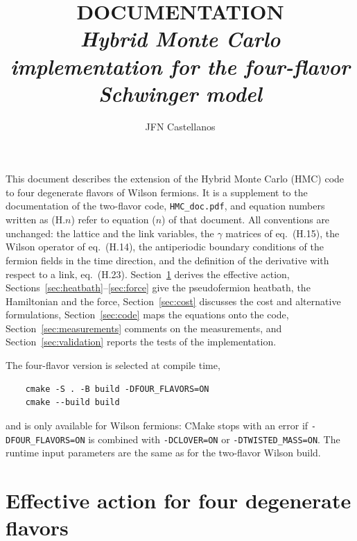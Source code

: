 \documentclass[11pt,a4paper]{article}
\title{\textbf{DOCUMENTATION}\\[0.8em]
\normalsize\emph{Hybrid Monte Carlo implementation for the four-flavor Schwinger model}}
\author{JFN Castellanos}
\date{}
\newcommand{\code}[1]{\texttt{#1}}
\newcommand{\hmcdoc}{\texttt{HMC\_doc.pdf}}
\begin{document}
\maketitle

\noindent
This document describes the extension of the Hybrid Monte Carlo (HMC) code to four degenerate flavors of
Wilson fermions. It is a supplement to the documentation of the two-flavor code, \hmcdoc, and equation numbers
written as (H.$n$) refer to equation ($n$) of that document. All conventions are unchanged: the lattice and the
link variables, the $\gamma$ matrices of eq.~(H.15), the Wilson operator of eq.~(H.14), the antiperiodic boundary
conditions of the fermion fields in the time direction, and the definition of the derivative with respect to a link,
eq.~(H.23). Section~\ref{sec:action} derives the effective action, Sections~\ref{sec:heatbath}--\ref{sec:force}
give the pseudofermion heatbath, the Hamiltonian and the force, Section~\ref{sec:cost} discusses the cost and
alternative formulations, Section~\ref{sec:code} maps the equations onto the code, Section~\ref{sec:measurements}
comments on the measurements, and Section~\ref{sec:validation} reports the tests of the implementation.

The four-flavor version is selected at compile time,
\begin{verbatim}
    cmake -S . -B build -DFOUR_FLAVORS=ON
    cmake --build build
\end{verbatim}
and is only available for Wilson fermions: CMake stops with an error if \code{-DFOUR\_FLAVORS=ON} is combined with
\code{-DCLOVER=ON} or \code{-DTWISTED\_MASS=ON}. The runtime input parameters are the same as for the two-flavor
Wilson build.

\section{Effective action for four degenerate flavors}
\label{sec:action}
\end{document}
